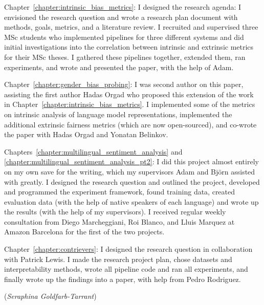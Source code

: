\documentclass[phd,ilcc,oneside,leftchapter,parskip]{infthesis}
\begin{document}
\begin{preliminary}
\begin{declaration}
   Chapter~\ref{chapter:intrinsic_bias_metrics}: I designed the research agenda: I envisioned the research question and wrote a research plan document with methods, goals, metrics, and a literature review. I recruited and supervised three MSc students who implemented pipelines for three different systems and did initial investigations into the correlation between intrinsic and extrinsic metrics for their MSc theses. I gathered these pipelines together, extended them, ran experiments, and wrote and presented the paper, with the help of Adam. 

   Chapter~\ref{chapter:gender_bias_probing}: I was second author on this paper, assisting the first author Hadas Orgad who proposed this extension of the work in Chapter~\ref{chapter:intrinsic_bias_metrics}. I implemented some of the metrics on intrinsic analysis of language model representations, implemented the additional extrinsic fairness metrics (which are now open-sourced), and co-wrote the paper with Hadas Orgad and Yonatan Belinkov.

   Chapters~\ref{chapter:multilingual_sentiment_analysis} and \ref{chapter:multilingual_sentiment_analysis_pt2}: I did this project almost entirely on my own save for the writing, which my supervisors Adam and Björn assisted with greatly. I designed the research question and outlined the project, developed and programmed the experiment framework, found training data, created evaluation data (with the help of native speakers of each language) and wrote up the results (with the help of my supervisors). I received regular weekly consultation from Diego Marcheggiani, Roi Blanco, and Lluis Marquez at Amazon Barcelona for the first of the two projects.

   Chapter~\ref{chapter:contrievers}: I designed the research question in collaboration with Patrick Lewis. I made the research project plan, chose datasets and interpretability methods, wrote all pipeline code and ran all experiments, and finally wrote up the findings into a paper, with help from Pedro Rodriguez.

   \par
   \vspace{1in}\raggedleft({\em Seraphina Goldfarb-Tarrant})
   \end{declaration}


\tableofcontents


\end{preliminary}
\end{document}
